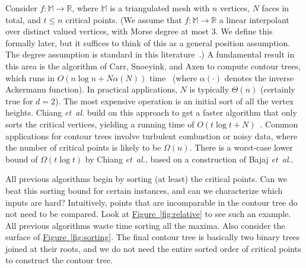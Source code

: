 \documentclass[11pt]{article}
\theoremstyle{definition}
\newcommand{\MM}{\mathbb{M}}
\newcommand{\RR}{\mathbb{R}}
\newcommand{\Fig}[1]{\hyperref[fig:#1]{Figure~\ref*{fig:#1}}} %
\newcommand{\Reminder}[1]{{\color{red}#1}}
\newcommand{\Sesh}[1]{\Reminder{Sesh interjects: #1}}
\newcommand{\etal}{\textit{et~al.}\xspace}
\newcommand{\XSays}[2]{{
      {$\rule[-0.12cm]{0.2in}{0.5cm}$\fbox{\tt
            #1:} }
      \textcolor{red}{#2}
      \marginpar{\textcolor{blue}{#1}}
      {$\rule[0.1cm]{0.3in}{0.1cm}$\fbox{\tt
            end}$\rule[0.1cm]{0.3in}{0.1cm}$}
      }
   }
\renewcommand{\XSays}[2]{}%
\newcommand{\Ben}[1]{{\XSays{Ben}{#1}}}
\begin{document}
Consider $f: \MM \to \RR$, where $\MM$ is a triangulated mesh with $n$ vertices, $N$ faces in total, and $t \leq n$ critical points. 
(We assume that $f:\MM \to \RR$ a linear interpolant over distinct valued vertices, with Morse degree at most $3$. We define this formally 
later, but it suffices to think of this as a general position assumption.
The degree assumption is standard in this literature~\cite{kobps-ctsssit-97}.)
A fundamental result in this area is the algorithm of Carr, Snoeyink, and Axen to compute contour trees,
which runs in $O(n\log n + N\alpha(N))$ time~\cite{csa-cctad-03} (where $\alpha(\cdot)$ denotes the inverse
Ackermann function). In practical applications, $N$ is typically $\Theta(n)$
(certainly true for $d=2$). The most expensive operation is an initial sort of all the vertex
heights. Chiang \etal build on this approach to get a faster algorithm that only sorts the critical vertices,
yielding a running time of $O(t\log t + N)$~\cite{cllr-sooscctmp-05}.
Common applications for contour trees involve turbulent combustion or noisy data, where the number of critical points is likely to be $\Omega(n)$.
There is a worst-case
lower bound of $\Omega(t\log t)$ by Chiang \etal \cite{cllr-sooscctmp-05}, based on a construction of Bajaj \etal \cite{BaKr+98}.

All previous algorithms begin by sorting (at least) the critical points. Can we beat this sorting bound for certain instances,
and can we characterize which inputs are hard? Intuitively, points that are incomparable in the contour tree
do not need to be compared. Look at \Fig{relative} to see such an example. All previous algorithms waste time
sorting all the maxima. Also consider the surface of \Fig{sorting}. The final contour tree is basically two binary
trees joined at their roots, and we do not need the entire sorted order of critical points
to construct the contour tree. 

\end{document}
